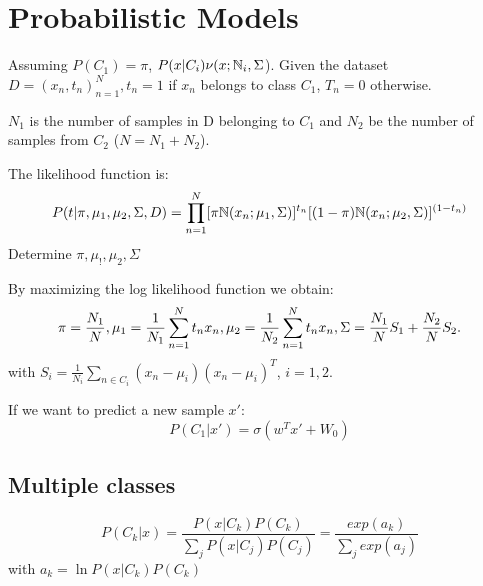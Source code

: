 \section{Probabilistic Models}
Assuming $P(C_{1}) = \pi$, $P(x|C_{i})\nu (x; \mathbb{N} _{i}, \Sigma$). Given the dataset $D = {(x_{n}, t_{n})^{N}_{n=1}}, t_{n}=1$ if $x_{n}$ belongs to class $C_{1}$, $T_{n} = 0$ otherwise.

$N_{1}$ is the number of samples in D belonging to $C_{1}$ and $N_{2}$ be the number of samples from $C_{2}$ ($N = N_{1} + N_{2}$).

The likelihood function is:
\begin{equation}
    P(t|\pi, \mu _{1}, \mu_{2}, \Sigma, D) = \prod_{n=1}^{N}[\pi \mathbb{N} (x_{n};\mu_{1}, \Sigma)]^{t_{n}}
    [(1 - \pi) \mathbb{N} (x_{n};\mu_{2}, \Sigma)]^{(1 - t_{n})}
\end{equation}
Determine $\pi, \mu_{!}, \mu_{2}, \Sigma$

By maximizing the log likelihood function we obtain:
\begin{equation}
    \pi = \frac{N_{1}}{N}, \\
    \mu_{1} = \frac{1}{N_{1}} \sum_{n=1}^{N}t_{n}x_{n}, \\
    \mu_{2} = \frac{1}{N_{2}} \sum_{n=1}^{N}t_{n}x_{n}, \\
    \Sigma = \frac{N_1}{N}S_{1} + \frac{N_2}{N}S_{2}. 
\end{equation}
with $S_{i} = \frac{1}{N_{i}} \sum_{n \in C_{i}}(x_{n} - \mu_{i})(x_{n} - \mu_{i})^{T}$, $i = 1, 2$.

If we want to predict a new sample $x'$:
\begin{equation}
    P(C_{1}|x') = \sigma (w^{T}x' + W_{0})
\end{equation}
\subsection{Multiple classes}

\begin{equation}
    P(C_{k}|x) = \frac{P(x|C_{k})P(C_{k})}{\sum_{j}P(x|C_{j})P(C_{j})} = \frac{exp(a_{k})}{\sum_{j}exp(a_{j})}
\end{equation}
with $a_{k} = \ln P(x|C_{k})P(C_{k})$\ \

